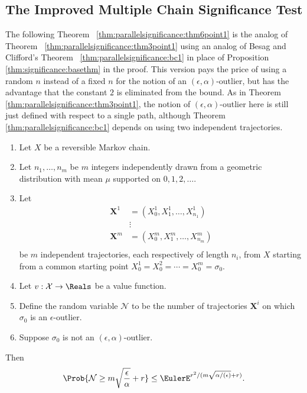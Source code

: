 \documentclass[12pt]{article}
\begin{document}
\subsection*{The Improved Multiple Chain Significance Test}

The following Theorem~%
\ref{thm:parallelsignificance:thm6point1} is the analog of Theorem~%
\ref{thm:parallelsignificance:thm3point1} using an analog of Besag and
Clifford's Theorem~%
\ref{thm:parallelsignificance:bc1} in place of Proposition~%
\ref{thm:significance:basethm} in the proof.  This version pays the
price of using a random \( n \) instead of a fixed \( n \) for the
notion of an \( (\epsilon, \alpha) \)-outlier, but has the advantage
that the constant \( 2 \) is eliminated from the bound.  As in Theorem~%
\ref{thm:parallelsignificance:thm3point1}, the notion of \( (\epsilon,
\alpha) \)-outlier here is still just defined with respect to a single
path, although Theorem~%
\ref{thm:parallelsignificance:bc1} depends on using two independent
trajectories.

\begin{theorem}
    \label{thm:parallelsignificance:thm6point1}
    \begin{enumerate}
        \item
            Let \( X \) be a reversible Markov chain.
        \item
            Let \( n_1, \dots, n_m \) be \( m \) integers independently
            drawn from a geometric distribution with mean \( \mu \)
            supported on \( 0,1,2,\dots \).
        \item
            Let
            \begin{align*}
                \mathbf{X}^1    &= (X_0^1, X_1^1, \dots, X_{n_1}^1 )\\
                &\vdots \\
                \mathbf{X}^m    &= (X_0^m, X_1^m, \dots, X_{n_m}^m )\\
            \end{align*}
            be \( m \) independent trajectories, each respectively of
            length \( n_{i} \), from \( X \) starting from a common
            starting point \( X_0^1 = X_0^2 = \cdots = X_0^m = \sigma_0 \).
        \item
            Let \( v :  \mathcal{X} \to \Reals \) be a value function.
        \item
            Define the random variable \( \mathcal{N} \) to be the
            number of trajectories \( \mathbf{X}^i \) on which \( \sigma_0
            \) is an \( \epsilon \)-outlier.
        \item
            Suppose \( \sigma_0 \) is not an \( (\epsilon, \alpha) \)-outlier.
    \end{enumerate}
    Then
    \[
        \Prob{\mathcal{N} \ge m \sqrt{\frac{\epsilon}{\alpha}} + r} \le
        \EulerE^{r^2/( m \sqrt{\alpha/(\epsilon)} + r)}.
    \]
\end{theorem}
\end{document}

